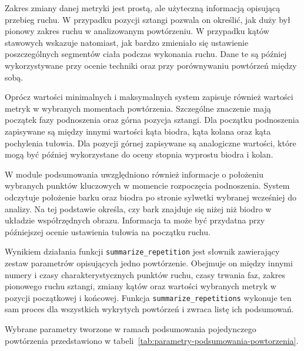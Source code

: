 Zakres zmiany danej metryki jest prostą, ale użyteczną informacją opisującą przebieg ruchu. W przypadku pozycji sztangi pozwala on określić, jak duży był pionowy zakres ruchu w analizowanym powtórzeniu. W przypadku kątów stawowych wskazuje natomiast, jak bardzo zmieniało się ustawienie poszczególnych segmentów ciała podczas wykonania ruchu. Dane te są później wykorzystywane przy ocenie techniki oraz przy porównywaniu powtórzeń między sobą.

Oprócz wartości minimalnych i maksymalnych system zapisuje również wartości metryk w wybranych momentach powtórzenia. Szczególne znaczenie mają początek fazy podnoszenia oraz górna pozycja sztangi. Dla początku podnoszenia zapisywane są między innymi wartości kąta biodra, kąta kolana oraz kąta pochylenia tułowia. Dla pozycji górnej zapisywane są analogiczne wartości, które mogą być później wykorzystane do oceny stopnia wyprostu biodra i kolan.

W module podsumowania uwzględniono również informacje o położeniu wybranych punktów kluczowych w momencie rozpoczęcia podnoszenia. System odczytuje położenie barku oraz biodra po stronie sylwetki wybranej wcześniej do analizy. Na tej podstawie określa, czy bark znajduje się niżej niż biodro w układzie współrzędnych obrazu. Informacja ta może być przydatna przy późniejszej ocenie ustawienia tułowia na początku ruchu.

Wynikiem działania funkcji \texttt{summarize\_repetition} jest słownik zawierający zestaw parametrów opisujących jedno powtórzenie. Obejmuje on między innymi numery i czasy charakterystycznych punktów ruchu, czasy trwania faz, zakres pionowego ruchu sztangi, zmiany kątów oraz wartości wybranych metryk w pozycji początkowej i końcowej. Funkcja \texttt{summarize\_repetitions} wykonuje ten sam proces dla wszystkich wykrytych powtórzeń i zwraca listę ich podsumowań.

Wybrane parametry tworzone w ramach podsumowania pojedynczego powtórzenia przedstawiono w tabeli~\ref{tab:parametry-podsumowania-powtorzenia}.

